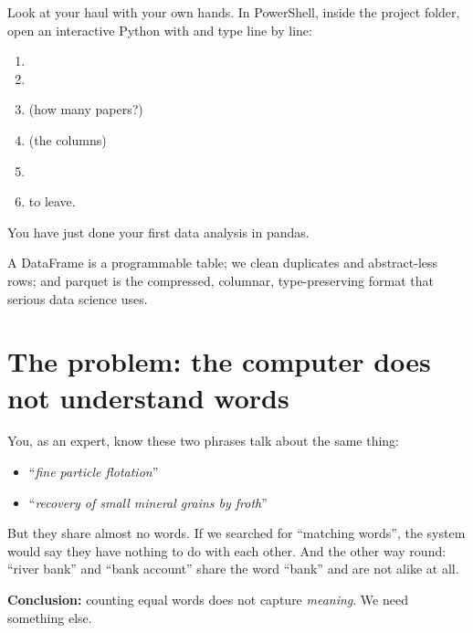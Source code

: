 \documentclass[11pt,a4paper]{article}
\begin{document}
\begin{practica}
Look at your haul with your own hands. In PowerShell, inside the project folder, open an
interactive Python with  and
type line by line:
\begin{enumerate}
  \item {}
  \item {}
  \item {} \quad (how many papers?)
  \item {} \quad (the columns)
  \item {}
  \item {} to leave.
\end{enumerate}
You have just done your first data analysis in pandas.
\end{practica}

\begin{resumen}
A DataFrame is a programmable table; we clean duplicates and abstract-less rows; and parquet
is the compressed, columnar, type-preserving format that serious data science uses.
\end{resumen}
\clearpage
{}
{}

\section{The problem: the computer does not understand words}

You, as an expert, know these two phrases talk about the same thing:
\begin{itemize}
  \item ``\emph{fine particle flotation}''
  \item ``\emph{recovery of small mineral grains by froth}''
\end{itemize}
But they share almost no words. If we searched for ``matching words'', the system would say
they have nothing to do with each other. And the other way round: ``river bank'' and ``bank
account'' share the word ``bank'' and are not alike at all.

\textbf{Conclusion:} counting equal words does not capture \emph{meaning}. We need something
else.
\end{document}
